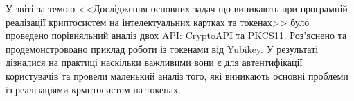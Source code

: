 
У звіті за темою <<Дослідження основних задач що виникають при програмній реалізації криптосистем на інтелектуальних картках та токенах>> було проведено порівняльний аналіз двох API: CryptoAPI та PKCS11. Роз'яснено та продемонстровоано приклад роботи із токенами від Yubikey. У результаті дізналися на практиці наскільки важливими вони є для автентифікації користувачів та провели маленький аналіз того, які виникають основні проблеми із реалізаціями крмптосистем на токенах.